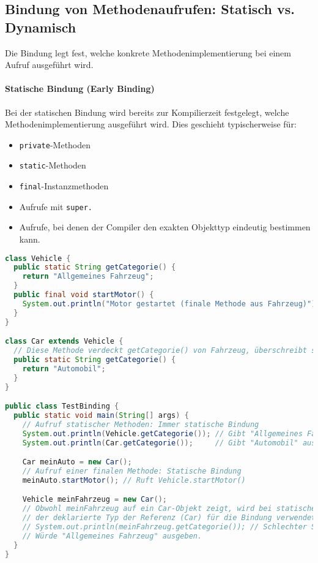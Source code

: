 \subsection{Bindung von Methodenaufrufen: Statisch vs. Dynamisch}
\label{ssec:bindungen}

Die Bindung legt fest, welche konkrete Methodenimplementierung bei einem Aufruf ausgeführt wird.

\paragraph{Statische Bindung (Early Binding)}
Bei der statischen Bindung wird bereits zur Kompilierzeit festgelegt, welche Methodenimplementierung ausgeführt wird. Dies geschieht typischerweise für:
\begin{itemize}
    \item \texttt{private}-Methoden
    \item \texttt{static}-Methoden
    \item \texttt{final}-Instanzmethoden
    \item Aufrufe mit \texttt{super.}
    \item Aufrufe, bei denen der Compiler den exakten Objekttyp eindeutig bestimmen kann.
\end{itemize}

\begin{lstlisting}[language=Java, caption={Beispiele für statische Bindung}]
class Vehicle {
  public static String getCategorie() {
    return "Allgemeines Fahrzeug";
  }
  public final void startMotor() {
    System.out.println("Motor gestartet (finale Methode aus Fahrzeug)");
  }
}

class Car extends Vehicle {
  // Diese Methode verdeckt getCategorie() von Fahrzeug, überschreibt sie aber nicht.
  public static String getCategorie() {
    return "Automobil";
  }
}

public class TestBinding {
  public static void main(String[] args) {
    // Aufruf statischer Methoden: Immer statische Bindung
    System.out.println(Vehicle.getCategorie()); // Gibt "Allgemeines Fahrzeug" aus
    System.out.println(Car.getCategorie());     // Gibt "Automobil" aus

    Car meinAuto = new Car();
    // Aufruf einer finalen Methode: Statische Bindung
    meinAuto.startMotor(); // Ruft Vehicle.startMotor()

    Vehicle meinFahrzeug = new Car();
    // Obwohl meinFahrzeug auf ein Car-Objekt zeigt, wird bei statischen Methoden
    // der deklarierte Typ der Referenz (Car) für die Bindung verwendet.
    // System.out.println(meinFahrzeug.getCategorie()); // Schlechter Stil! Sollte Vehicle.getCategorie() sein.
    // Würde "Allgemeines Fahrzeug" ausgeben.
  }
}
\end{lstlisting}

